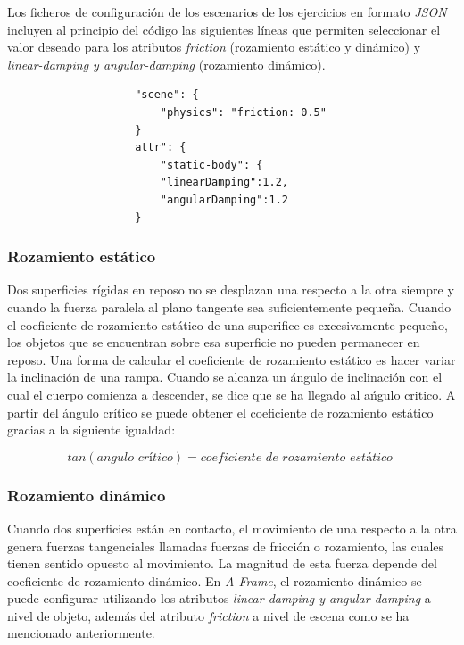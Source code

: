 Los ficheros de configuración de los escenarios de los ejercicios en formato \textit{JSON} incluyen al principio del código las siguientes líneas que permiten seleccionar el valor deseado para los atributos \textit{friction} (rozamiento estático y dinámico) y \textit{linear-damping y angular-damping} (rozamiento dinámico).

\small
\begin{verbatim}
                    "scene": {
                        "physics": "friction: 0.5"
                    }
                    attr": {
                        "static-body": {
                        "linearDamping":1.2,
                        "angularDamping":1.2
                    }
\end{verbatim}

\normalsize
\subsubsection{Rozamiento estático}
Dos superficies rígidas en reposo no se desplazan una respecto a la otra siempre y cuando la fuerza paralela al plano tangente sea suficientemente pequeña. Cuando el coeficiente de rozamiento estático de una superifice es excesivamente pequeño, los objetos que se encuentran sobre esa superficie no pueden permanecer en reposo. Una forma de calcular el coeficiente de rozamiento estático es hacer variar la inclinación de una rampa. Cuando se alcanza un ángulo de inclinación con el cual el cuerpo comienza a descender, se dice que se ha llegado al ańgulo critico. A partir del ángulo crítico se puede obtener el coeficiente de rozamiento estático gracias a la siguiente igualdad:

\begin{equation}
    tan(angulo \,\, crítico) = coeficiente \,\, de \,\, rozamiento \,\, estático \,\,
\end{equation}

\subsubsection{Rozamiento dinámico}
Cuando dos superficies están en contacto, el movimiento de una respecto a la otra genera fuerzas tangenciales llamadas fuerzas de fricción o rozamiento, las cuales tienen sentido opuesto al movimiento. La magnitud de esta fuerza depende del coeficiente de rozamiento dinámico. En \textit{A-Frame}, el rozamiento dinámico se puede configurar utilizando los atributos \textit{linear-damping y angular-damping} a nivel de objeto, además del atributo \textit{friction} a nivel de escena como se ha mencionado anteriormente. 



